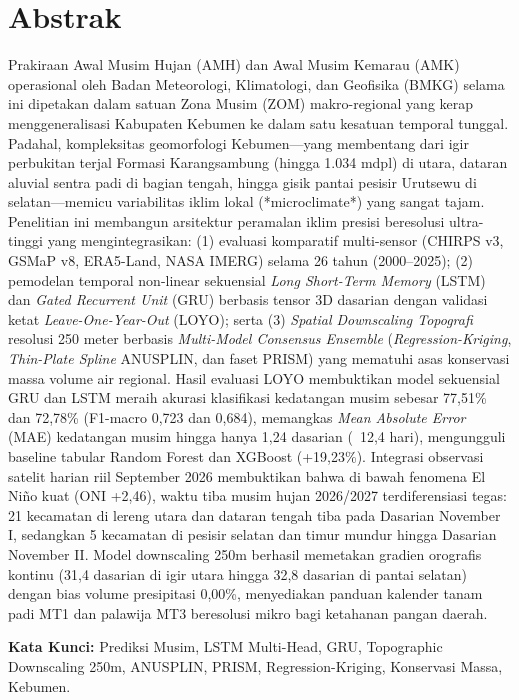 \documentclass[11pt,a4paper]{article}
\begin{document}
\section*{Abstrak}
Prakiraan Awal Musim Hujan (AMH) dan Awal Musim Kemarau (AMK) operasional oleh Badan Meteorologi, Klimatologi, dan Geofisika (BMKG) selama ini dipetakan dalam satuan Zona Musim (ZOM) makro-regional yang kerap menggeneralisasi Kabupaten Kebumen ke dalam satu kesatuan temporal tunggal. Padahal, kompleksitas geomorfologi Kebumen---yang membentang dari igir perbukitan terjal Formasi Karangsambung (hingga 1.034 mdpl) di utara, dataran aluvial sentra padi di bagian tengah, hingga gisik pantai pesisir Urutsewu di selatan---memicu variabilitas iklim lokal (*microclimate*) yang sangat tajam. Penelitian ini membangun arsitektur peramalan iklim presisi beresolusi ultra-tinggi yang mengintegrasikan: (1) evaluasi komparatif multi-sensor (CHIRPS v3, GSMaP v8, ERA5-Land, NASA IMERG) selama 26 tahun (2000--2025); (2) pemodelan temporal non-linear sekuensial \textit{Long Short-Term Memory} (LSTM) dan \textit{Gated Recurrent Unit} (GRU) berbasis tensor 3D dasarian dengan validasi ketat \textit{Leave-One-Year-Out} (LOYO); serta (3) \textit{Spatial Downscaling Topografi} resolusi 250 meter berbasis \textit{Multi-Model Consensus Ensemble} (\textit{Regression-Kriging}, \textit{Thin-Plate Spline} ANUSPLIN, dan faset PRISM) yang mematuhi asas konservasi massa volume air regional. Hasil evaluasi LOYO membuktikan model sekuensial GRU dan LSTM meraih akurasi klasifikasi kedatangan musim sebesar 77,51\% dan 72,78\% (F1-macro 0,723 dan 0,684), memangkas \textit{Mean Absolute Error} (MAE) kedatangan musim hingga hanya 1,24 dasarian (~12,4 hari), mengungguli baseline tabular Random Forest dan XGBoost (+19,23\%). Integrasi observasi satelit harian riil September 2026 membuktikan bahwa di bawah fenomena El Ni\~no kuat (ONI +2,46), waktu tiba musim hujan 2026/2027 terdiferensiasi tegas: 21 kecamatan di lereng utara dan dataran tengah tiba pada Dasarian November I, sedangkan 5 kecamatan di pesisir selatan dan timur mundur hingga Dasarian November II. Model downscaling 250m berhasil memetakan gradien orografis kontinu (31,4 dasarian di igir utara hingga 32,8 dasarian di pantai selatan) dengan bias volume presipitasi 0,00\%, menyediakan panduan kalender tanam padi MT1 dan palawija MT3 beresolusi mikro bagi ketahanan pangan daerah.

\vspace{0.8cm}
\noindent\textbf{Kata Kunci:} Prediksi Musim, LSTM Multi-Head, GRU, Topographic Downscaling 250m, ANUSPLIN, PRISM, Regression-Kriging, Konservasi Massa, Kebumen.
\end{document}
